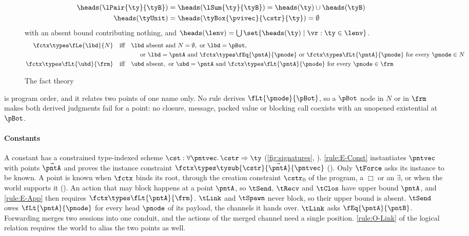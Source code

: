 \begin{figure}[tp]
\begin{align*}
    \\
    \heads(\lPair{\ty}{\tyB}) &= \heads(\lSum{\ty}{\tyB}) = \heads(\ty) \cup \heads(\tyB)
    \\
    \heads(\tyUnit) &= \heads(\tyBox{\pvivec}{\cstr}{\ty}) = \emptyset
  \end{align*}
  with an absent bound contributing nothing, and
  $\heads(\lenv) = \bigcup \set{\heads(\ty) \mid \vr : \ty \in \lenv}$.
  \begin{align*}
    \fctx \types \fLe{\lbd}{N}
    &\quad\text{iff}\quad
    \lbd \text{ absent and } N = \emptyset,
    \text{ or } \lbd = \pBot,
    \\ & \qquad\qquad
    \text{ or } \lbd = \pntA \text{ and }
      \fctx \types \fEq{\pntA}{\pnode} \text{ or } \fctx \types \fLt{\pntA}{\pnode}
      \text{ for every } \pnode \in N
    \\
    \fctx \types \fLt{\ubd}{\frm}
    &\quad\text{iff}\quad
    \ubd \text{ absent},
    \text{ or } \ubd = \pntA \text{ and }
      \fctx \types \fLt{\pntA}{\pnode} \text{ for every } \pnode \in \frm
  \end{align*}
  \caption{The fact theory}
  \label{fig:facts}
\end{figure}

 is program order, and it relates two points of one name
only. No rule derives $\fLt{\pnode}{\pBot}$, so a $\pBot$ node in $N$ or
in $\frm$ makes both derived judgments fail for a point: no closure,
message, packed value or blocking call coexists with an unopened
existential at $\pBot$.

\paragraph{Constants}
A constant has a constrained type-indexed scheme
$\cst : \forall \pntvec.\, \cstr \Rightarrow \ty$
(\cref{fig:signatures}, ). \ref{rule:E-Const} instantiates
$\pntvec$ with points $\vec{\pntA}$ and proves the instance
constraint $\fctx \types \tysub{\cstr}{\vec{\pntA}}{\pntvec}$
(). Only $\tForce$ asks its instance to be known. A point is known when $\fctx$ binds its root, through
the creation constraint $\cstr_0$ of the program, a $\Box$ or an
$\exists$, or when the world supports it (). An action that may block happens at a point $\pntA$,
so $\tSend$, $\tRecv$ and $\tClos$ have upper bound $\pntA$, and
\ref{rule:E-App} then requires $\fctx \types \fLt{\pntA}{\frm}$. $\tLink$
and $\tSpawn$ never block, so their upper bound is absent. $\tSend$ owes
$\fLt{\pntA}{\pnode}$ for every head $\pnode$ of its payload, the
channels it hands over. $\tLink$ asks $\fEq{\pntA}{\pntB}$. Forwarding
merges two sessions into one conduit, and the actions of the merged
channel need a single position. \ref{rule:O-Link} of the logical relation
requires the world to alias the two points as well. %

